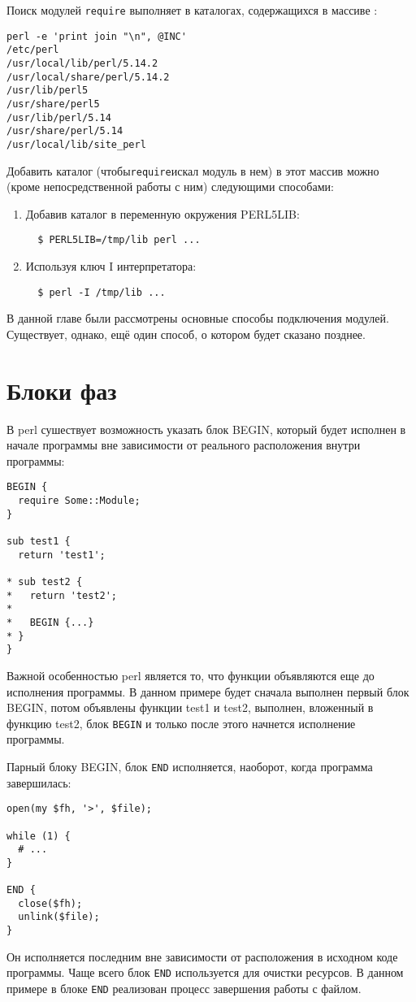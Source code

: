 Поиск модулей \verb|require| выполняет в каталогах, содержащихся в массиве \@INC:
\begin{verbatim}
perl -e 'print join "\n", @INC'
/etc/perl
/usr/local/lib/perl/5.14.2
/usr/local/share/perl/5.14.2
/usr/lib/perl5
/usr/share/perl5
/usr/lib/perl/5.14
/usr/share/perl/5.14
/usr/local/lib/site_perl
\end{verbatim}
Добавить каталог (чтобы\verb|require|искал модуль в нем) в этот массив можно (кроме непосредственной работы с ним) следующими способами:
\begin{enumerate}
	\item Добавив каталог в переменную окружения PERL5LIB:
  \begin{verbatim}
  $ PERL5LIB=/tmp/lib perl ...
  \end{verbatim}
	\item Используя ключ I интерпретатора:
  \begin{verbatim}
  $ perl -I /tmp/lib ...
  \end{verbatim}
\end{enumerate}
В данной главе были рассмотрены основные способы подключения модулей. Существует, однако, ещё один способ, о котором будет сказано позднее.

\section{Блоки фаз} %
В perl сушествует возможность указать блок BEGIN, который будет исполнен в начале программы вне зависимости от реального расположения внутри программы:
\begin{verbatim}
BEGIN {
  require Some::Module;
}

sub test1 {
  return 'test1';

* sub test2 {
*   return 'test2';
*
*   BEGIN {...}
* }
}
\end{verbatim}
Важной особенностью perl является то, что функции объявляются еще до исполнения программы. В данном примере будет сначала выполнен первый блок BEGIN, потом объявлены функции test1 и test2, выполнен, вложенный в функцию test2, блок \verb|BEGIN| и только после этого начнется исполнение программы.

Парный блоку BEGIN, блок \verb|END| исполняется, наоборот, когда программа завершилась:
\begin{verbatim}
open(my $fh, '>', $file);

while (1) {
  # ...
}

END {
  close($fh);
  unlink($file);
}
\end{verbatim}
Он исполняется последним вне зависимости от расположения в исходном коде программы. Чаще всего блок \verb|END| используется для очистки ресурсов. В данном примере в блоке \verb|END| реализован процесс завершения работы с файлом.

